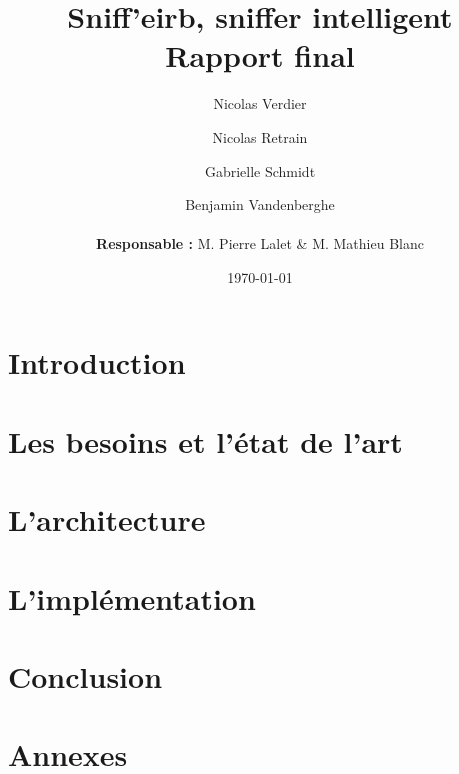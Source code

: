\documentclass[a4]{report}
\begin{document}
		
	\title{\Large{\textbf{Sniff'eirb, sniffer intelligent}}\\\Huge{\textbf{Rapport final}}}
	\author{
	Nicolas Verdier \and Nicolas Retrain \and Gabrielle Schmidt \and Benjamin Vandenberghe \\
	\\
	\textbf{Responsable : } M. Pierre Lalet \& M. Mathieu Blanc}
	\date{\today}
	
	\maketitle

	\tableofcontents{}
	\newpage
	
	\chapter*{Introduction}
		

	

		
	\chapter{Les besoins et l'état de l'art}
		
			
	\chapter{L'architecture}
		
		
	\chapter{L'implémentation}
		
	
						
	\chapter*{Conclusion}
		
	
	\chapter*{Annexes}
		
	
\end{document}
